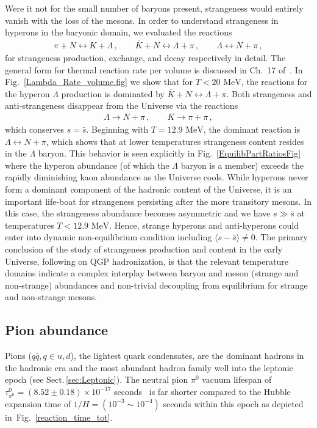\documentclass[universe,article,submit,moreauthors,pdftex,a4paper]{Definitions/mdpi}
\newcommand{\MeV}{\text{ MeV}}
\newcommand*{\rf}[1]{Fig.~{\ref{#1}}}
\newcommand*{\rsec}[1]{Sect.\,{\ref{#1}}}
\begin{document}
Were it not for the small number of baryons present, strangeness would entirely vanish with the loss of the mesons. In order to understand strangeness in hyperons in the baryonic domain, we evaluated the reactions 
\begin{align}
 \pi +N\leftrightarrow K+\Lambda\,,\qquad \overline{K}+N\leftrightarrow \Lambda+\pi\,,\qquad \Lambda\leftrightarrow N+\pi\,,
\end{align}
for strangeness production, exchange, and decay respectively in detail. The general form for thermal reaction rate per volume is discussed in Ch.~17 of~\cite{Letessier:2002ony}. In \rf{Lambda_Rate_volume.fig} we show that for $T<20\MeV$, the reactions for the hyperon $\Lambda$ production is dominated by $\overline{K}+N\leftrightarrow\Lambda+\pi$. Both strangeness and anti-strangeness disappear from the Universe via the reactions
\begin{align}
    \Lambda\rightarrow N+\pi\,,\qquad K\to\pi+\pi\,,
\end{align}
which conserves $s=\bar s$. Beginning with $T=12.9\MeV$, the dominant reaction is $\Lambda\leftrightarrow N+\pi$, which shows that at lower temperatures strangeness content resides in the $\Lambda$ baryon. This behavior is seen explicitly in \rf{EquilibPartRatiosFig} where the hyperon abundance (of which the $\Lambda$ baryon is a member) exceeds the rapidly diminishing kaon abundance as the Universe cools. While hyperons never form a dominant component of the hadronic content of the Universe, it is an important life-boat for strangeness persisting after the more transitory mesons. In this case, the strangeness abundance becomes asymmetric and we have $s\gg\bar{s}$ at temperatures $T<12.9\MeV$. Hence, strange hyperons and anti-hyperons could enter into dynamic non-equilibrium condition including $\langle s-\bar s\rangle \ne 0$. The primary conclusion of the study of strangeness production and content in the early Universe, following on QGP hadronization, is that the relevant temperature domains indicate a complex interplay between baryon and meson (strange and non-strange) abundances and non-trivial decoupling from equilibrium for strange and non-strange mesons.

\subsection{Pion abundance}\label{sec:Pions}
\noindent Pions ($q\bar q, q\in u,d$), the lightest quark condensates, are the dominant hadrons in the hadronic era and the most abundant hadron family well into the leptonic epoch (see \rsec{sec:Leptonic}). The neutral pion $\pi^0$ vacuum lifespan of $\tau_{\pi^0}^0=(8.52\pm0.18)\times10^{-17}$ seconds~\cite{ParticleDataGroup:2018ovx} is far shorter compared to the Hubble expansion time of $1/H=(10^{-3}\sim10^{-4})$ seconds within this epoch as depicted in~\rf{reaction_time_tot}.
\end{document}

